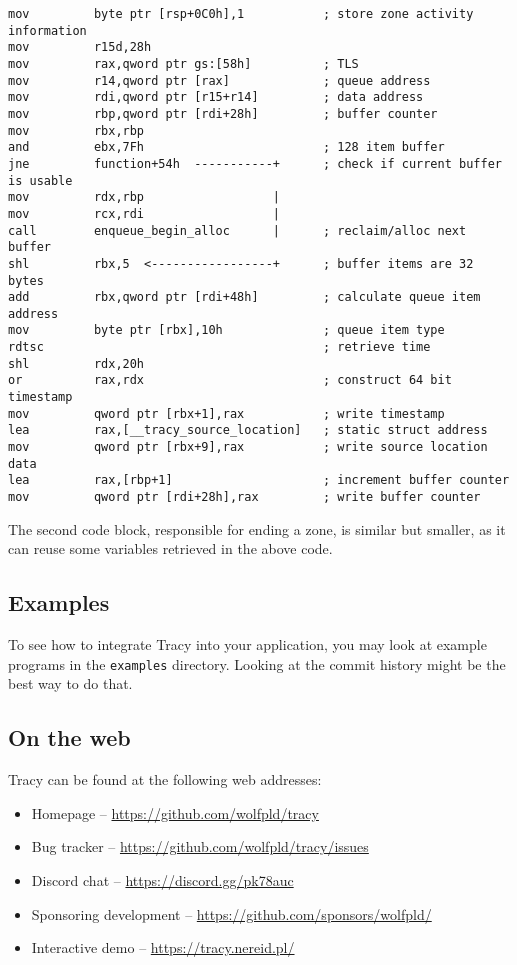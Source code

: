 \documentclass[hidelinks,titlepage,a4paper,twoside]{article}
\begin{document}
\begin{lstlisting}[language={[x86masm]Assembler}]
mov         byte ptr [rsp+0C0h],1           ; store zone activity information
mov         r15d,28h
mov         rax,qword ptr gs:[58h]          ; TLS
mov         r14,qword ptr [rax]             ; queue address
mov         rdi,qword ptr [r15+r14]         ; data address
mov         rbp,qword ptr [rdi+28h]         ; buffer counter
mov         rbx,rbp
and         ebx,7Fh                         ; 128 item buffer
jne         function+54h  -----------+      ; check if current buffer is usable
mov         rdx,rbp                  |
mov         rcx,rdi                  |
call        enqueue_begin_alloc      |      ; reclaim/alloc next buffer
shl         rbx,5  <-----------------+      ; buffer items are 32 bytes
add         rbx,qword ptr [rdi+48h]         ; calculate queue item address
mov         byte ptr [rbx],10h              ; queue item type
rdtsc                                       ; retrieve time
shl         rdx,20h
or          rax,rdx                         ; construct 64 bit timestamp
mov         qword ptr [rbx+1],rax           ; write timestamp
lea         rax,[__tracy_source_location]   ; static struct address
mov         qword ptr [rbx+9],rax           ; write source location data
lea         rax,[rbp+1]                     ; increment buffer counter
mov         qword ptr [rdi+28h],rax         ; write buffer counter
\end{lstlisting}

The second code block, responsible for ending a zone, is similar but smaller, as it can reuse some variables retrieved in the above code.

\subsection{Examples}

To see how to integrate Tracy into your application, you may look at example programs in the \texttt{examples} directory. Looking at the commit history might be the best way to do that.

\subsection{On the web}

Tracy can be found at the following web addresses:

\begin{itemize}
\item Homepage -- \url{https://github.com/wolfpld/tracy}
\item Bug tracker -- \url{https://github.com/wolfpld/tracy/issues}
\item Discord chat -- \url{https://discord.gg/pk78auc}
\item Sponsoring development -- \url{https://github.com/sponsors/wolfpld/}
\item Interactive demo -- \url{https://tracy.nereid.pl/}
\end{itemize}
\end{document}

